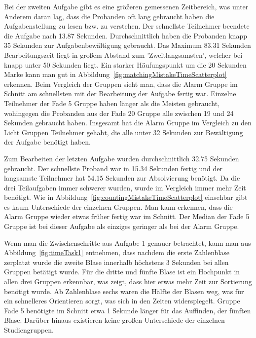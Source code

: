 Bei der zweiten Aufgabe gibt es eine größeren gemessenen Zeitbereich, was unter Anderem daran lag, dass die Probanden oft lang gebraucht haben die Aufgabenstellung zu lesen bzw. zu verstehen. Der schnellste Teilnehmer beendete die Aufgabe nach 13.87 Sekunden. Durchschnittlich haben die Probanden knapp 35 Sekunden zur Aufgabenbewältigung gebraucht. Das Maximum 83.31 Sekunden Bearbeitungszeit liegt in großem Abstand zum 'Zweitlangsamsten', welcher bei knapp unter 50 Sekunden liegt. Ein starker Häufungspunkt um die 20 Sekunden Marke kann man gut in Abbildung~\ref{fig:matchingMistakeTimeScatterplot} erkennen. 
Beim Vergleich der Gruppen sieht man, dass die Alarm Gruppe im Schnitt am schnellsten mit der Bearbeitung der Aufgabe fertig war. Einzelne Teilnehmer der Fade 5 Gruppe haben länger als die Meisten gebraucht, wohingegen die Probanden aus der Fade 20 Gruppe alle zwischen 19 und 24 Sekunden gebraucht haben. Insgesamt hat die Alarm Gruppe im Vergleich zu den Licht Gruppen Teilnehmer gehabt, die alle unter 32 Sekunden zur Bewältigung der Aufgabe benötigt haben.

Zum Bearbeiten der letzten Aufgabe wurden durchschnittlich 32.75 Sekunden gebraucht. Der schnellste Proband war in 15.34 Sekunden fertig und der langsamste Teilnehmer hat 54.15 Sekunden zur Absolvierung benötigt. Da die drei Teilaufgaben immer schwerer wurden, wurde im Vergleich immer mehr Zeit benötigt.
Wie in Abbildung~\ref{fig:countingMistakeTimeScatterplot} einsehbar gibt es kaum Unterschiede der einzelnen Gruppen. Man kann erkennen, dass die Alarm Gruppe wieder etwas früher fertig war im Schnitt. Der Median der Fade 5 Gruppe ist bei dieser Aufgabe als einziges geringer als bei der Alarm Gruppe.

Wenn man die Zwischenschritte aus Aufgabe 1 genauer betrachtet, kann man aus Abbildung~\ref{fig:timeTask1} entnehmen, dass nachdem die erste Zahlenblase zerplatzt wurde die zweite Blase innerhalb höchstens 3 Sekunden bei allen Gruppen betätigt wurde. Für die dritte und fünfte Blase ist ein Hochpunkt in allen drei Gruppen erkennbar, was zeigt, dass hier etwas mehr Zeit zur Sortierung benötigt wurde. Ab Zahlenblase sechs waren die Hälfte der Blasen weg, was für ein schnelleres Orientieren sorgt, was sich in den Zeiten widerspiegelt. Gruppe Fade 5 benötigte im Schnitt etwa 1 Sekunde länger für das Auffinden, der fünften Blase. Darüber hinaus existieren keine großen Unterschiede der einzelnen Studiengruppen.
 
